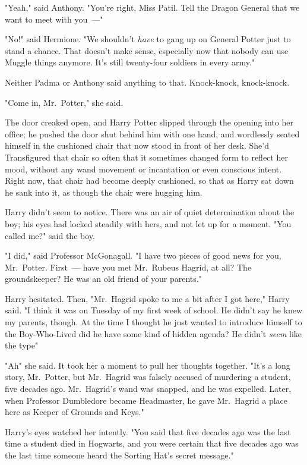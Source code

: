 "Yeah," said Anthony. "You're right, Miss Patil. Tell the Dragon General that
we want to meet with you~---"

"No!" said Hermione. "We shouldn't \emph{have} to gang up on General Potter
just to stand a chance. That doesn't make sense, especially now that nobody can
use Muggle things anymore. It's still twenty-four soldiers in every army."

Neither Padma or Anthony said anything to that.
\sbreak
Knock-knock, knock-knock.

"Come in, Mr.~Potter," she said.

The door creaked open, and Harry Potter slipped through the opening into her
office; he pushed the door shut behind him with one hand, and wordlessly seated
himself in the cushioned chair that now stood in front of her desk. She'd
Transfigured that chair so often that it sometimes changed form to reflect her
mood, without any wand movement or incantation or even conscious intent. Right
now, that chair had become deeply cushioned, so that as Harry sat down he sank
into it, as though the chair were hugging him.

Harry didn't seem to notice. There was an air of quiet determination about the
boy; his eyes had locked steadily with hers, and not let up for a moment. "You
called me?" said the boy.

"I did," said Professor McGonagall. "I have two pieces of good news for you,
Mr.~Potter. First~--- have you met Mr.~Rubeus Hagrid, at all? The groundskeeper?
He was an old friend of your parents."

Harry hesitated. Then, "Mr.~Hagrid spoke to me a bit after I got here," Harry
said. "I think it was on Tuesday of my first week of school. He didn't say he
knew my parents, though. At the time I thought he just wanted to introduce
himself to the Boy-Who-Lived{\el} did he have some kind of hidden agenda? He
didn't \emph{seem} like the type{\el}"

"Ah{\el}" she said. It took her a moment to pull her thoughts together.
"It's a long story, Mr.~Potter, but Mr.~Hagrid was falsely accused of murdering
a student, five decades ago. Mr.~Hagrid's wand was snapped, and he was
expelled. Later, when Professor Dumbledore became Headmaster, he gave
Mr.~Hagrid a place here as Keeper of Grounds and Keys."

Harry's eyes watched her intently. "You said that five decades ago was the last
time a student died in Hogwarts, and you were certain that five decades ago was
the last time someone heard the Sorting Hat's secret message."

